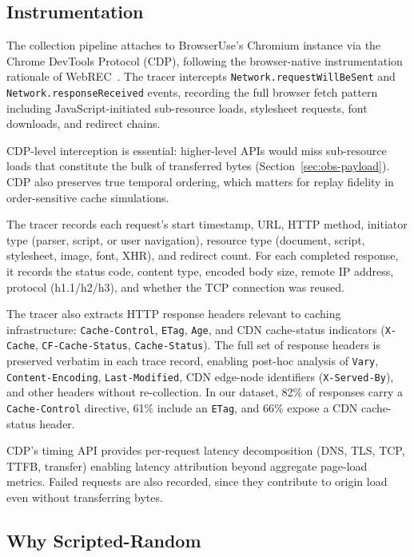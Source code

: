 \documentclass[10pt,sigconf,letterpaper,anonymous,nonacm]{acmart}
\begin{document}
\subsection{Instrumentation}

The collection pipeline attaches to BrowserUse's Chromium instance
via the Chrome DevTools Protocol (CDP\@), following the browser-native instrumentation rationale of WebREC~\cite{hantke2025webrec}.  The tracer intercepts
\texttt{Network.\allowbreak request\-Will\-Be\-Sent} and
\texttt{Network.\allowbreak response\-Received} events, recording the
full browser fetch pattern including JavaScript-initiated sub-resource
loads, stylesheet requests, font downloads, and redirect chains.

CDP-level interception is essential: higher-level APIs would miss
sub-resource loads that constitute the bulk of transferred bytes
(Section~\ref{sec:obs-payload}).  CDP also preserves true temporal
ordering, which matters for replay fidelity in order-sensitive
cache simulations.

The tracer records each request's start timestamp, URL, HTTP method,
initiator type (parser, script, or user navigation), resource type
(document, script, stylesheet, image, font, XHR), and redirect count.
For each completed response, it records the status code, content type,
encoded body size, remote IP address, protocol (h1.1/h2/h3), and
whether the TCP connection was reused.

The tracer also extracts HTTP response headers relevant to
caching infrastructure: \texttt{Cache-Control}, \texttt{ETag},
\texttt{Age}, and CDN cache-status indicators
(\texttt{X-Cache}, \texttt{CF-Cache-Status}, \texttt{Cache-Status}).
The full set of response headers is preserved verbatim in each trace
record, enabling post-hoc analysis of \texttt{Vary},
\texttt{Content-Encoding}, \texttt{Last-Modified}, CDN edge-node
identifiers (\texttt{X-Served-By}), and other headers without
re-collection.  In our dataset, 82\% of responses carry a
\texttt{Cache-Control} directive, 61\% include an \texttt{ETag}, and
66\% expose a CDN cache-status header.

CDP's timing API provides per-request latency decomposition (DNS,
TLS, TCP, TTFB, transfer) enabling latency attribution beyond
aggregate page-load metrics.  Failed requests are also recorded, since
they contribute to origin load even without transferring bytes.

\subsection{Why Scripted-Random}
\end{document}
